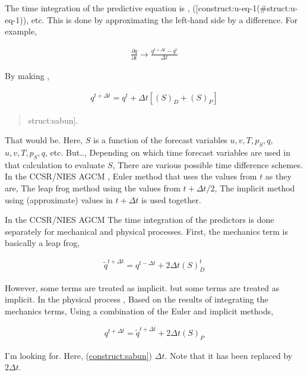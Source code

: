 The time integration of the predictive equation is ,
({[}construct:u-eq-1\en[construct:u-eq-1\end{eqnarray}](\#struct:u-eq-1)), etc. This
is done by approximating the left-hand side by a difference. For
example,

\begin{eqnarray}
  \frac{\partial q}{\partial t} \rightarrow \frac{q^{t+\Delta t} - q^{t}}{\Delta t}
\end{eqnarray}

By making ,

\begin{eqnarray}
  q^{t+\Delta t} = q^{t}
       + \Delta t \left[ \left( S \right)_D + \left( S \right)_P  \right]
\end{eqnarray}

\begin{quote}
\protect\hypertarget{struct:sabun}{}{\brahammer{[}struct:sabun{]}}.
\end{quote}

That would be. Here, \(S\) is a function of the forecast variables
\(u,v,T,p_S,q\), \(u,v,T,p_S,q\), etc. But.., Depending on which time
forecast variables are used in that calculation to evaluate \(S\), There
are various possible time difference schemes. In the CCSR/NIES AGCM ,
Euler method that uses the values from \(t\) as they are, The leap frog
method using the values from \(t+\Delta t/2\), The implicit method using
(approximate) values in \(t+\Delta t\) is used together.

In the CCSR/NIES AGCM The time integration of the predictors is done
separately for mechanical and physical processes. First, the mechanics
term is basically a leap frog,

\begin{eqnarray}
  \tilde{q}^{t+\Delta t} = q^{t-\Delta t} + 2 \Delta t \left( S \right)_D^{t}
\end{eqnarray}

However, some terms are treated as implicit. but some terms are treated
as implicit. In the physical process , Based on the results of
integrating the mechanics terms, Using a combination of the Euler and
implicit methods,

\begin{eqnarray}
  q^{t+\Delta t} = \tilde{q}^{t+\Delta t} + 2 \Delta t \left( S \right)_P
\end{eqnarray}

I'm looking for. Here,
(\protect\hyperlink{struct:sabun}{construct:sabun{]}}) \(\Delta t\).
Note that it has been replaced by \(2 \Delta t\).


